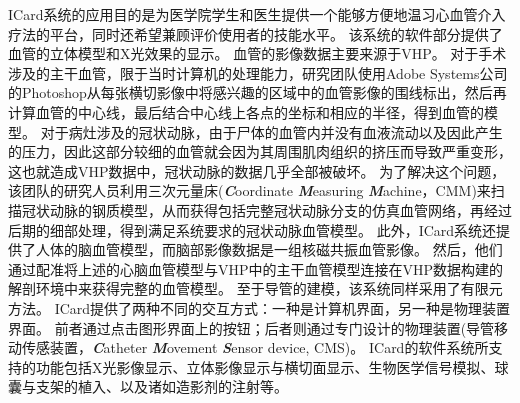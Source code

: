 ICard系统的应用目的是为医学院学生和医生提供一个能够方便地温习心血管介入疗法的平台，同时还希望兼顾评价使用者的技能水平。
该系统的软件部分提供了血管的立体模型和X光效果的显示\cite{Wang1998ICard}\cite{Wang1998aICard}。
血管的影像数据主要来源于VHP。
对于手术涉及的主干血管，限于当时计算机的处理能力，研究团队使用Adobe Systems公司的Photoshop从每张横切影像中将感兴趣的区域中的血管影像的围线标出，然后再计算血管的中心线，最后结合中心线上各点的坐标和相应的半径，得到血管的模型\cite{Wang1998ICard}。
对于病灶涉及的冠状动脉，由于尸体的血管内并没有血液流动以及因此产生的压力，因此这部分较细的血管就会因为其周围肌肉组织的挤压而导致严重变形，这也就造成VHP数据中，冠状动脉的数据几乎全部被破坏\cite{Wang1998ICard}。
为了解决这个问题，该团队的研究人员利用三次元量床(\textbf{\textit{C}}oordinate \textbf{\textit{M}}easuring \textbf{\textit{M}}achine，CMM)\cite{CMMweb}来扫描冠状动脉的钢质模型\cite{KyotoModelweb}，从而获得包括完整冠状动脉分支的仿真血管网络，再经过后期的细部处理，得到满足系统要求的冠状动脉血管模型\cite{Wang1998ICard}。
此外，ICard系统还提供了人体的脑血管模型\cite{Serra1997Vessel}\cite{Poston1995Vessel}，而脑部影像数据是一组核磁共振血管影像\cite{Wang1998ICard}。
然后，他们通过配准将上述的心脑血管模型与VHP中的主干血管模型连接在VHP数据构建的解剖环境中来获得完整的血管模型\cite{Wang1998ICard}。
至于导管的建模，该系统同样采用了有限元方法\cite{Wang1998ICard}。
ICard提供了两种不同的交互方式：一种是计算机界面，另一种是物理装置界面\cite{Wang1998ICard}。
前者通过点击图形界面上的按钮；后者则通过专门设计的物理装置(导管移动传感装置，\textbf{\textit{C}}atheter \textbf{\textit{M}}ovement \textbf{\textit{S}}ensor device, CMS)\cite{Lim1998ICard}\cite{Lim1997ICard}。
ICard的软件系统所支持的功能包括X光影像显示、立体影像显示与横切面显示、生物医学信号模拟、球囊与支架的植入、以及诸如造影剂的注射等\cite{Wang1998ICard}。

